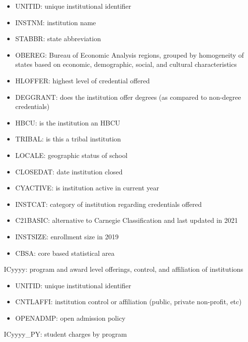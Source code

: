 \documentclass[sigconf, authorversion, nonacm]{acmart}
\begin{document}
        \begin{itemize}
            \item UNITID: unique institutional identifier
            \item INSTNM: institution name
            \item STABBR: state abbreviation
            \item OBEREG: Bureau of Economic Analysis regions, grouped by homogeneity of states based on economic, demographic, social, and cultural characteristics
            \item HLOFFER: highest level of credential offered
            \item DEGGRANT: does the institution offer degrees (as compared to non-degree credentials)
            \item HBCU: is the institution an HBCU
            \item TRIBAL: is this a tribal institution
            \item LOCALE: geographic status of school
            \item CLOSEDAT: date institution closed
            \item CYACTIVE: is institution active in current year
            \item INSTCAT: category of institution regarding credentials offered
            \item C21BASIC: alternative to Carnegie Classification and last updated in 2021
            \item INSTSIZE: enrollment size in 2019
            \item CBSA: core based statistical area
        \end{itemize}

        ICyyyy: program and award level offerings, control, and affiliation of institutions

        \begin{itemize}
            \item UNITID: unique institutional identifier
            \item CNTLAFFI: institution control or affiliation (public, private non-profit, etc)
            \item OPENADMP: open admission policy
        \end{itemize}

        ICyyyy\_PY: student charges by program
\end{document}
